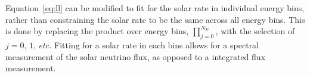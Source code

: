 Equation~\eqref{eq:ll} can be modified to fit for the solar rate in individual
energy bins, rather than constraining the solar rate to be the same across
all energy bins. This is done by replacing the product over energy bins,
$\prod_{j=0}^{N_E}$, with the selection of $j=0\text{, }1\text{, }$\textit{etc.}
Fitting for a solar rate in each bins allows for a spectral measurement of the
solar neutrino flux, as opposed to a integrated flux measurement.
